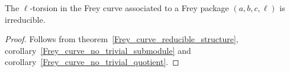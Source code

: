\begin{theorem}\label{Frey_curve_irreducible} The $\ell$-torsion in the Frey curve associated to a Frey package $(a,b,c,\ell)$ is irreducible.
\end{theorem}
\begin{proof} Follows from theorem~\ref{Frey_curve_reducible_structure}, corollary~\ref{Frey_curve_no_trivial_submodule}
  and corollary~\ref{Frey_curve_no_trivial_quotient}.
\end{proof}
